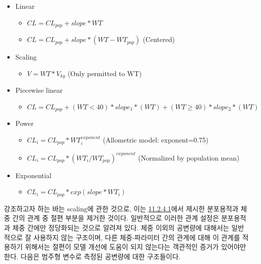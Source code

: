 \documentclass[
  11pt,
  krantz2,
  a4paper]{krantz}
\providecommand{\tightlist}{%
  \setlength{\itemsep}{0pt}\setlength{\parskip}{0pt}}
\theoremstyle{definition}
\theoremstyle{definition}
\theoremstyle{definition}
\theoremstyle{remark}
\begin{document}
\begin{itemize}
\tightlist
\item
  Linear

  \begin{itemize}
  \tightlist
  \item
    \(CL = CL_{pop} + slope * WT\)
  \item
    \(CL = CL_{pop} + slope * (WT-WT_{pop})\) \hfill (Centered)
  \end{itemize}
\item
  Scaling

  \begin{itemize}
  \tightlist
  \item
    \(V = WT * V_{kg}\) \hfill (Only permitted to WT)
  \end{itemize}
\item
  Piecewise linear

  \begin{itemize}
  \tightlist
  \item
    \(CL = CL_{pop} + (WT<40)*slope_1*(WT) + (WT\geq40)*slope_2*(WT)\)
  \end{itemize}
\item
  Power

  \begin{itemize}
  \tightlist
  \item
    \(CL_i = CL_{pop} * WT_i^{exponent}\) \hfill (Allometric model: exponent=0.75)
  \item
    \(CL_i = CL_{pop} * (WT_i/WT_{pop})^{exponent}\) \hfill (Normalized by population mean)
  \end{itemize}
\item
  Exponential

  \begin{itemize}
  \tightlist
  \item
    \(CL_i = CL_{pop} * exp(slope*WT_i)\)
  \end{itemize}
\end{itemize}

강조하고자 하는 바는 scaling에 관한 것으로, 이는 \protect\hyperlink{forward-sel-def}{11.2.4.1}에서 제시한 분포용적과 체중 간의 관계 중 절편 부분을 제거한 것이다. 일반적으로 이러한 관계 설정은 분포용적과 체중 간에만 정당화되는 것으로 알려져 있다. 체중 이외의 공변량에 대해서는 일반적으로 잘 사용하지 않는 구조이며, 다른 체중-파라미터 간의 관계에 대해 이 관계를 적용하기 위해서는 절편이 모델 개선에 도움이 되지 않는다는 객관적인 증거가 있어야만 한다. 다음은 범주형 변수로 측정된 공변량에 대한 구조들이다.
\end{document}
